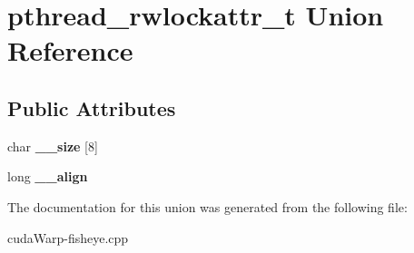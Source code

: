 \hypertarget{unionpthread__rwlockattr__t}{}\section{pthread\+\_\+rwlockattr\+\_\+t Union Reference}
\label{unionpthread__rwlockattr__t}
\subsection*{Public Attributes}
\begin{DoxyCompactItemize}
\item 
char {\bfseries \+\_\+\+\_\+size} \mbox{[}8\mbox{]}\hypertarget{unionpthread__rwlockattr__t_a8e3d0f4d516ea7c405b737ba331c5061}{}\label{unionpthread__rwlockattr__t_a8e3d0f4d516ea7c405b737ba331c5061}

\item 
long {\bfseries \+\_\+\+\_\+align}\hypertarget{unionpthread__rwlockattr__t_a64afbb06540422a1b610a1fd164522bb}{}\label{unionpthread__rwlockattr__t_a64afbb06540422a1b610a1fd164522bb}

\end{DoxyCompactItemize}


The documentation for this union was generated from the following file\+:\begin{DoxyCompactItemize}
\item 
cuda\+Warp-\/fisheye.\+cpp\end{DoxyCompactItemize}
